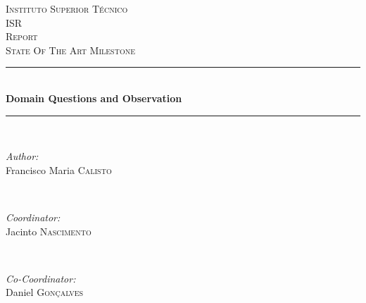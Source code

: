 \begin{titlepage}

\newcommand{\HRule}{\rule{\linewidth}{0.5mm}} %

\center %
 

\textsc{\LARGE Instituto Superior T\'{e}cnico}\\[1.5cm]
\textsc{\Large ISR}\\[0.5cm]
\textsc{\large Report}\\[0.25cm]
\textsc{\small State Of The Art Milestone}\\[0.25cm]


\HRule \\[0.5cm]
{\large \bfseries Domain Questions and Observation}\\[0.25cm] %
\HRule \\[0.5cm]
 

\begin{minipage}{0.4\textwidth}
\begin{flushleft} \large
\emph{Author:}\\
Francisco Maria \textsc{Calisto} %
\end{flushleft}
\end{minipage}
~
\begin{minipage}{0.4\textwidth}
\begin{flushright} \large
\emph{Coordinator:} \\
Jacinto \textsc{Nascimento} %
\end{flushright}
~
\begin{flushright} \large
\emph{Co-Coordinator:} \\
Daniel \textsc{Gon\c{c}alves} %
\end{flushright}
\end{minipage}\\[2cm]


\end{titlepage}
